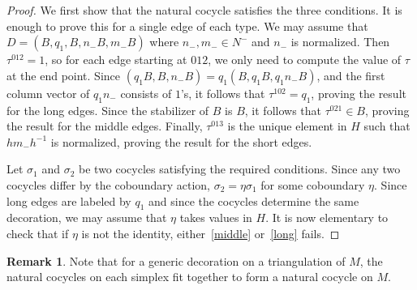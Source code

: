 \documentclass[12pt]{amsart}
\theoremstyle{definition}
\newtheorem{lemma}[theorem]{Lemma}
\newtheorem{remark}[theorem]{Remark}
\numberwithin{equation}{section}
\def\SL{\mathrm{SL}}
\def\PGL{\mathrm{PGL}}
\def\C{\mathbb{C}}
\def\T{\mathcal{T}}
\begin{document}
\begin{proof}
We first show that the natural cocycle satisfies the three conditions.
It is enough to prove this for a single edge of each type. We may assume that $D=(B,q_1,B,n_-B,m_-B)$ where $n_-, m_-\in N^-$ and $n_-$ is normalized. Then $\tau^{012}=1$, so for each edge starting at $012$, we only need to compute the value of $\tau$ at the end point. Since $(q_1B,B,n_-B)=q_1(B,q_1B,q_1n_-B)$, and the first column vector of $q_1n_-$ consists of $1$'s, it follows that $\tau^{102}=q_1$, proving the result for the long edges.
Since the stabilizer of $B$ is $B$, it follows that $\tau^{021}\in B$, proving the result for the middle edges.
Finally, $\tau^{013}$ is the unique element in $H$ such that $hm_-h^{-1}$ is normalized, proving the result for the short edges.

Let $\sigma_1$ and $\sigma_2$ be two cocycles satisfying the required conditions. Since any two cocycles differ by the coboundary action, $\sigma_2=\eta\sigma_1$ for some coboundary $\eta$. Since long edges are labeled by $q_1$ and since the cocycles determine the same decoration, we may assume that $\eta$ takes values in $H$. It is now elementary to check that if $\eta$ is not the identity, either~\eqref{middle} or~\eqref{long} fails.
\end{proof}

\begin{remark}
Note that for a generic decoration on a triangulation of $M$, the natural cocycles on each simplex fit together to form a natural cocycle on $M$.
\end{remark}
\end{document}
